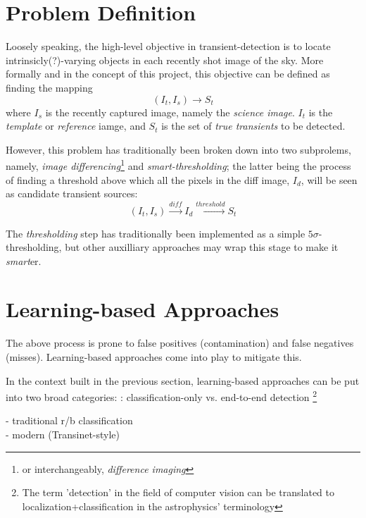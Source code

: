 \section{Problem Definition}

Loosely speaking, the high-level objective in transient-detection is to locate intrinsicly(?)-varying objects in each recently shot image of the sky.
More formally and in the concept of this project, this objective can be defined as finding the mapping
\begin{equation}
  \label{eq:def1}
  (I_t,I_s) \longrightarrow S_t 
\end{equation}
where $I_s$ is the recently captured image, namely the \emph{science image}. $I_t$ is the \emph{template} or \emph{reference} iamge, and $S_t$ is the set of \emph{true transients} to be detected.

However, this problem has traditionally been broken down into two subprolems, namely, \emph{image differencing}\footnote{or interchangeably, \emph{difference imaging}} and \emph{smart-thresholding}; the latter being the process of finding a threshold above which all the pixels in the diff image, $I_d$, will be seen as candidate transient sources:
\begin{equation}
  \label{eq:def2}
  (I_t,I_s) \xrightarrow{diff} I_d \xrightarrow{threshold} S_t 
\end{equation}

The \emph{thresholding} step has traditionally been implemented as a simple $5\sigma$-thresholding, but other auxilliary approaches may wrap this stage to make it \emph{smart}er.

\section{Learning-based Approaches}
\label{sec:learning}
The above process is prone to false positives (contamination) and false negatives (misses). Learning-based approaches come into play to mitigate this.

In the context built in the previous section, learning-based approaches can be put into two broad categories:
: classification-only vs. end-to-end detection \footnote{The term 'detection' in the field of computer vision can be translated to localization+classification in the astrophysics' terminology}

- traditional r/b classification
\\- modern (Transinet-style)\\

